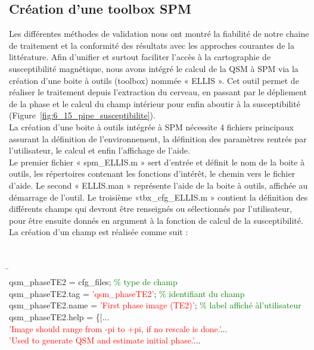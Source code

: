 {\subsection{Création d’une toolbox SPM}
Les différentes méthodes de validation nous ont montré la fiabilité de notre chaine de
traitement et la conformité des résultats avec les approches courantes de la littérature. Afin d’unifier
et surtout faciliter l’accès à la cartographie de susceptibilité magnétique, nous avons intégré le calcul
de la QSM à SPM via la création d’une boite à outils (toolbox) nommée « ELLIS ». Cet outil permet de
réaliser le traitement depuis l’extraction du cerveau, en passant par le dépliement de la phase et le
calcul du champ intérieur pour enfin aboutir à la susceptibilité (Figure~\ref{fig:6_15_pipe_susceptibilite}).\\
La création d’une boite à outils intégrée à SPM nécessite 4 fichiers principaux assurant la
définition de l’environnement, la définition des paramètres rentrés par l’utilisateur, le calcul et enfin
l’affichage de l’aide.\\
Le premier fichier « spm\_ELLIS.m » sert d’entrée et définit le nom de la boite à outils, les
répertoires contenant les fonctions d’intérêt, le chemin vers le fichier d’aide. Le second « ELLIS.man »
représente l’aide de la boite à outils, affichée au démarrage de l’outil. Le troisième «tbx\_cfg\_ELLIS.m »
contient la définition des différents champs qui devront être renseignés ou sélectionnés par
l’utilisateur, pour être ensuite donnés en argument à la fonction de calcul de la susceptibilité. La
création d’un champ est réalisée comme suit :\\ 
{\tt
\begin{tabbing}
\hspace{1cm}\=\hspace{1cm}\\
\> qsm\_phaseTE2 = cfg\_files; \textcolor{green}{\% type de champ}\\
\> qsm\_phaseTE2.tag = \textcolor{red}{'qsm\_phaseTE2'}; \textcolor{green}{\% identifiant du champ}\\
\> qsm\_phaseTE2.name = \textcolor{red}{'First phase image (TE2)'}; \textcolor{green}{\% label affiché àl'utilisateur}\\
\> qsm\_phaseTE2.help = \{[...\\
\> \textcolor{red}{'Image should range from -pi to +pi, if no rescale is done.'}...\\
\> \textcolor{red}{'Used to generate QSM and estimate initial phase.'}...\\

\end{tabbing}}}
